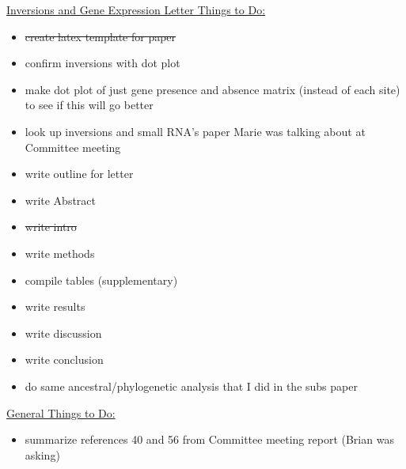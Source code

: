 \documentclass[12pt]{article}
\newcommand{\p}{progressiveMauve\xspace}
\newcommand{\ecoli}{\textit{Escherichia coli}\xspace}
\begin{document}
\underline{Inversions and Gene Expression Letter Things to Do:}
\begin{itemize}
%	
%	
%	
%	
%	
	\item \sout{create latex template for paper}

	\item confirm inversions with dot plot
	\item make dot plot of just gene presence and absence matrix (instead of each site) to see if this will go better
	\item look up inversions and small RNA's paper Marie was talking about at Committee meeting
	\item write outline for letter
	\item write Abstract
	\item \sout{write intro}
	\item write methods
	\item compile tables (supplementary)
	\item write results
	\item write discussion
	\item write conclusion 
	\item do same ancestral/phylogenetic analysis that I did in the subs paper 
\end{itemize}

\underline{General Things to Do:}
\begin{itemize}
	\item summarize references 40 and 56 from Committee meeting report (Brian was asking)
	
	
\end{itemize}
\end{document}
